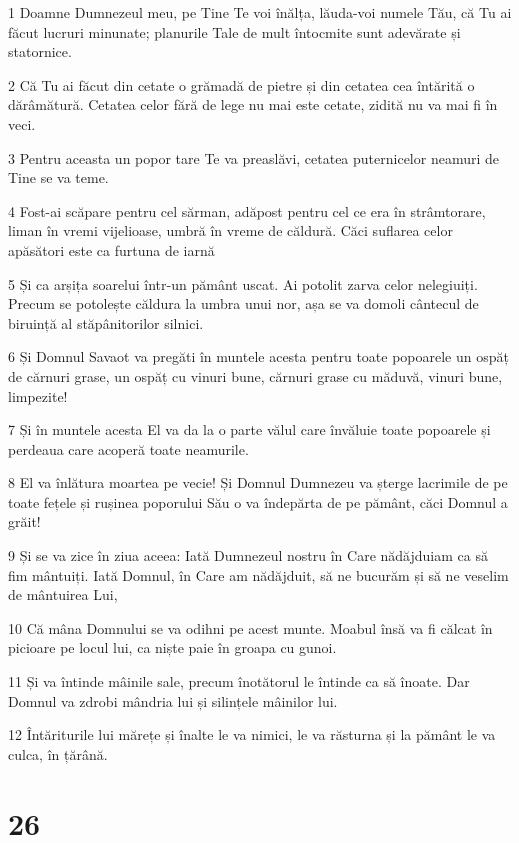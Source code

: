 \par 1 Doamne Dumnezeul meu, pe Tine Te voi înălța, lăuda-voi numele Tău, că Tu ai făcut lucruri minunate; planurile Tale de mult întocmite sunt adevărate și statornice.
\par 2 Că Tu ai făcut din cetate o grămadă de pietre și din cetatea cea întărită o dărâmătură. Cetatea celor fără de lege nu mai este cetate, zidită nu va mai fi în veci.
\par 3 Pentru aceasta un popor tare Te va preaslăvi, cetatea puternicelor neamuri de Tine se va teme.
\par 4 Fost-ai scăpare pentru cel sărman, adăpost pentru cel ce era în strâmtorare, liman în vremi vijelioase, umbră în vreme de căldură. Căci suflarea celor apăsători este ca furtuna de iarnă
\par 5 Și ca arșița soarelui într-un pământ uscat. Ai potolit zarva celor nelegiuiți. Precum se potolește căldura la umbra unui nor, așa se va domoli cântecul de biruință al stăpânitorilor silnici.
\par 6 Și Domnul Savaot va pregăti în muntele acesta pentru toate popoarele un ospăț de cărnuri grase, un ospăț cu vinuri bune, cărnuri grase cu măduvă, vinuri bune, limpezite!
\par 7 Și în muntele acesta El va da la o parte vălul care învăluie toate popoarele și perdeaua care acoperă toate neamurile.
\par 8 El va înlătura moartea pe vecie! Și Domnul Dumnezeu va șterge lacrimile de pe toate fețele și rușinea poporului Său o va îndepărta de pe pământ, căci Domnul a grăit!
\par 9 Și se va zice în ziua aceea: Iată Dumnezeul nostru în Care nădăjduiam ca să fim mântuiți. Iată Domnul, în Care am nădăjduit, să ne bucurăm și să ne veselim de mântuirea Lui,
\par 10 Că mâna Domnului se va odihni pe acest munte. Moabul însă va fi călcat în picioare pe locul lui, ca niște paie în groapa cu gunoi.
\par 11 Și va întinde mâinile sale, precum înotătorul le întinde ca să înoate. Dar Domnul va zdrobi mândria lui și silințele mâinilor lui.
\par 12 Întăriturile lui mărețe și înalte le va nimici, le va răsturna și la pământ le va culca, în țărână.

\chapter{26}

